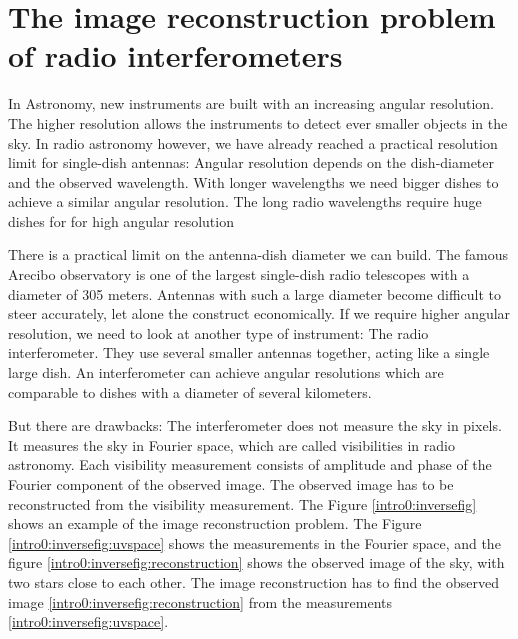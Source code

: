 \section{The image reconstruction problem of radio interferometers}
In Astronomy, new instruments are built with an increasing angular resolution. The higher resolution allows the instruments to detect ever smaller objects in the sky. In radio astronomy however, we have already reached a practical resolution limit for single-dish antennas: Angular resolution depends on the dish-diameter and the observed wavelength. With longer wavelengths we need bigger dishes to achieve a similar angular resolution. The long radio wavelengths require huge dishes for for high angular resolution

There is a practical limit on the antenna-dish diameter we can build. The famous Arecibo observatory is one of the largest single-dish radio telescopes with a diameter of 305 meters. Antennas with such a large diameter become difficult to steer accurately, let alone the construct economically. If we require higher angular resolution, we need to look at another type of instrument: The radio interferometer. They use several smaller antennas together, acting like a single large dish. An interferometer can achieve angular resolutions which are comparable to dishes with a diameter of several kilometers.

But there are drawbacks: The interferometer does not measure the sky in pixels. It measures the sky in Fourier space, which are called visibilities in radio astronomy. Each visibility measurement consists of amplitude and phase of the Fourier component of the observed image. The observed image has to be reconstructed from the visibility measurement. The Figure \ref{intro0:inversefig} shows an example of the image reconstruction problem. The Figure \ref{intro0:inversefig:uvspace} shows the measurements in the Fourier space, and the figure \ref{intro0:inversefig:reconstruction} shows the observed image of the sky, with two stars close to each other. The image reconstruction has to find the observed image \ref{intro0:inversefig:reconstruction} from the measurements \ref{intro0:inversefig:uvspace}. 

